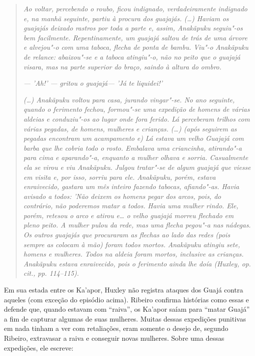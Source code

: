 \begin{quote}
\emph{Ao voltar, percebendo o roubo, ficou indignado, verdadeiramente
indignado e, na manhã seguinte, partiu à procura dos guajajás. (\ldots{})
Haviam os guajajás deixado rastros por toda a parte e, assim, Anakãpuku
seguiu"-os bem facilmente. Repentinamente, um guajajá saltou de trás de
uma árvore e alvejou"-o com uma taboca, flecha de ponta de bambu. Viu"-o
Anakãpuku de relance: abaixou"-se e a taboca atingiu"-o, não no peito que
o guajajá visara, mas na parte superior do braço, saindo à altura do
ombro.}

\noindent\emph{--- 'Ah!' --- gritou o guajajá--- 'Já te liquidei!'}

\noindent\emph{(\ldots{}) Anakãpuku voltou para casa, jurando vingar"-se. No ano seguinte,
quando o ferimento fechou, formou"-se uma expedição de homens de várias
aldeias e conduziu"-os ao lugar onde fora ferido. Lá perceberam trilhos
com várias pegadas, de homens, mulheres e crianças. (\ldots{}) (após seguirem
as pegadas encontram um acampamento e) Lá estava um velho Guajajá com
barba que lhe cobria todo o rosto. Embalava uma criancinha, atirando"-a
para cima e aparando"-a, enquanto a mulher olhava e sorria. Casualmente
ela se virou e viu Anakãpuku. Julgou tratar"-se de algum guajajá que
viesse em visita e, por isso, sorriu para ele. Anakãpuku, porém, estava
enraivecido, gastara um mês inteiro fazendo tabocas, afiando"-as. Havia
avisado a todos: 'Não deixem os homens pegar dos arcos, pois, do
contrário, não poderemos matar a todos. Havia uma mulher rindo. Ele,
porém, retesou o arco e atirou e\ldots{} o velho guajajá morreu flechado em
pleno peito. A mulher pulou da rede, mas uma flecha pegou"-a nas nádegas.
Os outros guajajás que procuraram as flechas ao lado das redes (pois
sempre as colocam à mão) foram todos mortos. Anakãpuku atingiu sete,
homens e mulheres. Todos na aldeia foram mortos, inclusive as crianças.
Anakãpuku estava enraivecido, pois o ferimento ainda lhe doía (Huxley,
\emph{op. cit.}, pp. 114--115).}
\end{quote}

Em sua estada entre os Ka'apor, Huxley não registra ataques dos Guajá
contra aqueles (com exceção do episódio acima). Ribeiro confirma
histórias como essas e defende que, quando estavam com ``raiva'', os
Ka'apor saíam para ``matar Guajá'' a fim de capturar algumas de suas
mulheres. Muitas dessas expedições punitivas em nada tinham a ver com
retaliações, eram somente o desejo de, segundo Ribeiro, extravasar a
raiva e conseguir novas mulheres. Sobre uma dessas expedições, ele
escreve:

